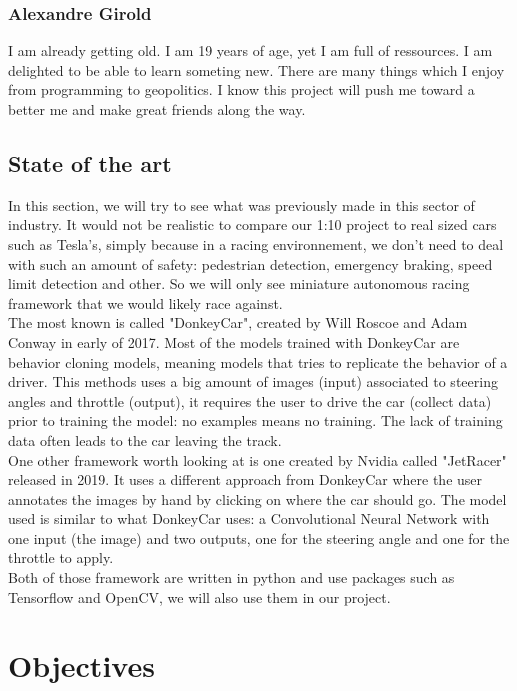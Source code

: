 \documentclass[12pt]{article}
\begin{document}
\subsubsection{Alexandre Girold}
I am already getting old. I am 19 years of age, yet I am full of ressources. I am delighted to be able to learn someting new. There are many things which I enjoy from programming to geopolitics. I know this project will push me toward a better me and make great friends along the way. 

\subsection{State of the art}
In this section, we will try to see what was previously made in this sector of industry.
It would not be realistic to compare our 1:10 project to real sized cars such as Tesla's, simply because in a racing environnement,
we don't need to deal with such an amount of safety: pedestrian detection, emergency braking, speed limit detection and other.
So we will only see miniature autonomous racing framework that we would likely race against.\\

The most known is called "DonkeyCar", created by Will Roscoe and Adam Conway in early of 2017. Most of the models trained with DonkeyCar are behavior cloning models, meaning models that tries to replicate the behavior of a driver. This methods uses a big amount of images (input) associated to steering angles and throttle (output), it requires the user to drive the car (collect data) prior to training the model: no examples means no training. The lack of training data often leads to the car leaving the track.\\

One other framework worth looking at is one created by Nvidia called "JetRacer" released in 2019. It uses a different approach from DonkeyCar where the user annotates the images by hand by clicking on where the car should go. The model used is similar to what DonkeyCar uses: a Convolutional Neural Network with one input (the image) and two outputs, one for the steering angle and one for the throttle to apply. \\

Both of those framework are written in python and use packages such as Tensorflow and OpenCV, we will also use them in our project.
\newpage

\section{Objectives}
\end{document}

